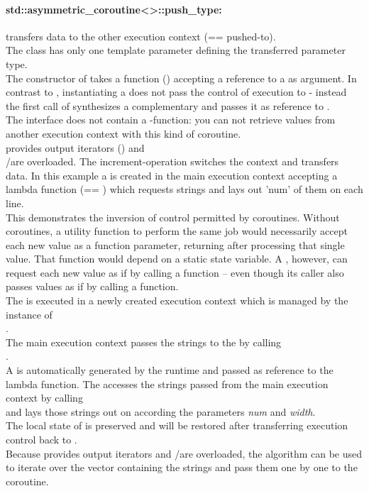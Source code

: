\paragraph*{std::asymmetric\_coroutine<>::push\_type:}
transfers data to the other execution context (== pushed-to).\\
The class has only one template parameter defining the transferred parameter
type.\\
The constructor of \pushcoro takes a function (\corofunction) accepting a
reference to a \pullcoro as argument. In contrast to \pullcoro, instantiating a
\pushcoro does not pass the control of execution to \corofunction{ }- instead
the first call of \pushcoroop synthesizes a complementary \pullcoro and passes
it as reference to \corofunction.\\
\newline
The interface does not contain a \get-function: you can not retrieve
values from another execution context with this kind of coroutine.\\
\newline
\pushcoro provides output iterators (\pushcoroiterator) and\\
\bgin/\ed are overloaded. The increment-operation switches the context and
transfers data.
In this example a \pushcoro is created in the main execution context accepting
a lambda function (== \corofunction) which requests strings and lays out 'num'
of them on each line.\\
This demonstrates the inversion of control permitted by coroutines. Without
coroutines, a utility function to perform the same job would necessarily
accept each new value as a function parameter, returning after processing that
single value. That function would depend on a static state variable. A
\corofunction, however, can request each new value as if by calling a function
-- even though its caller also passes values as if by calling a function.\\
The \corofunction is executed in a newly created execution context which is
managed by the instance of\\
\pushcoro.\\
The main execution context passes the strings to the
\corofunction by calling\\
\pushcoroop.\\
A \pullcoro is automatically generated by the runtime and passed as reference
to the lambda function. The \corofunction accesses the strings passed
from the main execution context by calling\\
\pullcoroget and lays those
strings out on  according the parameters \textit{num} and \textit{width}.\\
The local state of \corofunction is preserved and will be restored after
transferring execution control back to \corofunction.\\
Because \pushcoro provides output iterators and \bgin/\ed are overloaded, the
 algorithm can be used to iterate over the vector containing the
strings and pass them one by one to the coroutine.

